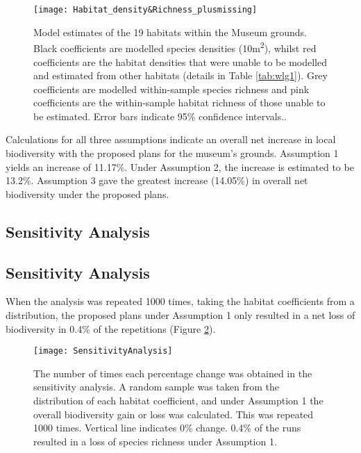 \begin{figure}[t]
	\centering
	\texttt{[image: Habitat\_density\&Richness\_plusmissing]}
	\caption{Model estimates of the 19 habitats within the Museum grounds. Black coefficients are modelled species densities (10m\textsuperscript{2}), whilst red coefficients are the habitat densities that were unable to be modelled and estimated from other habitats (details in Table \ref{tab:wlg1}). Grey coefficients are modelled within-sample species richness and pink coefficients are the within-sample habitat richness of those unable to be estimated. Error bars indicate 95\% confidence intervals..}
   	 \label{fig:wlgmodel}
\end{figure}
	
Calculations for all three assumptions indicate an overall net increase in local biodiversity with the proposed plans for the museum's grounds. Assumption 1 yields an increase of 11.17\%. Under Assumption 2, the increase is estimated to be 13.2\%. Assumption 3 gave the greatest increase (14.05\%) in overall net biodiversity under the proposed plans.

\ifappendixStyle %
\subsection{Sensitivity Analysis}%
\else
\subsection*{Sensitivity Analysis}
\fi

When the analysis was repeated 1000 times, taking the habitat coefficients from a distribution, the proposed plans under Assumption 1 only resulted in a net loss of biodiversity in 0.4\% of the repetitions (Figure \ref{fig:wlgsensitivity}).

\begin{figure}[t]
	\centering
	\texttt{[image: SensitivityAnalysis]}
	\caption{The number of times each percentage change was obtained in the sensitivity analysis. A random sample was taken from the distribution of each habitat coefficient, and under Assumption 1 the overall biodiversity gain or loss was calculated. This was repeated 1000 times. Vertical line indicates 0\% change. 0.4\% of the runs resulted in a loss of species richness under Assumption 1.}
   	 \label{fig:wlgsensitivity}
\end{figure}

\ifappendixStyle %
